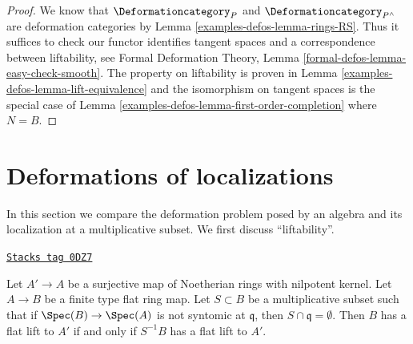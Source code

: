 \begin{proof}
We know that $\Deformationcategory_P$ and $\Deformationcategory_{P^\wedge}$
are deformation categories by Lemma \ref{examples-defos-lemma-rings-RS}.
Thus it suffices to check
our functor identifies tangent spaces and a correspondence
between liftability, see
Formal Deformation Theory, Lemma \ref{formal-defos-lemma-easy-check-smooth}.
The property on liftability is proven in
Lemma \ref{examples-defos-lemma-lift-equivalence}
and the isomorphism on tangent spaces is the special case of
Lemma \ref{examples-defos-lemma-first-order-completion} where $N = B$.
\end{proof}

\section{Deformations of localizations}
\label{examples-defos-section-compare-localization}
In this section we compare the deformation problem posed
by an algebra and its localization at a multiplicative subset.
We first discuss ``liftability''.

\begin{lemma}
\label{examples-defos-lemma-lift-equivalence-localization}
\href{https://stacks.math.columbia.edu/tag/0DZ7}{\texttt{Stacks tag 0DZ7}}

Let $A' \to A$ be a surjective map of Noetherian rings with nilpotent kernel.
Let $A \to B$ be a finite type flat ring map.
Let $S \subset B$ be a multiplicative subset such that
if $\Spec(B) \to \Spec(A)$ is not syntomic at $\mathfrak q$,
then $S \cap \mathfrak q = \emptyset$.
Then $B$ has a flat lift to $A'$ if and only if
$S^{-1}B$ has a flat lift to $A'$.
\end{lemma}

